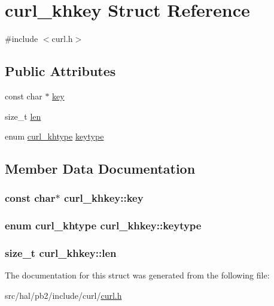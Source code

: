\hypertarget{structcurl__khkey}{}\section{curl\+\_\+khkey Struct Reference}
\label{structcurl__khkey}


{\ttfamily \#include $<$curl.\+h$>$}

\subsection*{Public Attributes}
\begin{DoxyCompactItemize}
\item 
const char $\ast$ \hyperlink{structcurl__khkey_ab6dc0c5de64ec75832ac1984ec243087}{key}
\item 
size\+\_\+t \hyperlink{structcurl__khkey_abb9d6b5435d96a5abc8dbb1e29cbee4e}{len}
\item 
enum \hyperlink{curl_8h_ad99a943e7fdfac731261a696fbc8b526}{curl\+\_\+khtype} \hyperlink{structcurl__khkey_aebcbb84554e2e574d209132be43697f8}{keytype}
\end{DoxyCompactItemize}


\subsection{Member Data Documentation}
\subsubsection[{\texorpdfstring{key}{key}}]{\setlength{\rightskip}{0pt plus 5cm}const char$\ast$ curl\+\_\+khkey\+::key}\hypertarget{structcurl__khkey_ab6dc0c5de64ec75832ac1984ec243087}{}\label{structcurl__khkey_ab6dc0c5de64ec75832ac1984ec243087}
\subsubsection[{\texorpdfstring{keytype}{keytype}}]{\setlength{\rightskip}{0pt plus 5cm}enum {\bf curl\+\_\+khtype} curl\+\_\+khkey\+::keytype}\hypertarget{structcurl__khkey_aebcbb84554e2e574d209132be43697f8}{}\label{structcurl__khkey_aebcbb84554e2e574d209132be43697f8}
\subsubsection[{\texorpdfstring{len}{len}}]{\setlength{\rightskip}{0pt plus 5cm}size\+\_\+t curl\+\_\+khkey\+::len}\hypertarget{structcurl__khkey_abb9d6b5435d96a5abc8dbb1e29cbee4e}{}\label{structcurl__khkey_abb9d6b5435d96a5abc8dbb1e29cbee4e}


The documentation for this struct was generated from the following file\+:\begin{DoxyCompactItemize}
\item 
src/hal/pb2/include/curl/\hyperlink{curl_8h}{curl.\+h}\end{DoxyCompactItemize}
